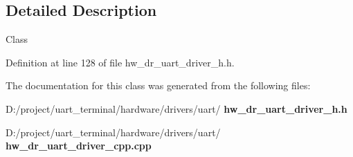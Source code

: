 \subsection{Detailed Description}
Class 

Definition at line 128 of file hw\+\_\+dr\+\_\+uart\+\_\+driver\+\_\+h.\+h.



The documentation for this class was generated from the following files\+:\begin{DoxyCompactItemize}
\item 
D\+:/project/uart\+\_\+terminal/hardware/drivers/uart/\textbf{ hw\+\_\+dr\+\_\+uart\+\_\+driver\+\_\+h.\+h}\item 
D\+:/project/uart\+\_\+terminal/hardware/drivers/uart/\textbf{ hw\+\_\+dr\+\_\+uart\+\_\+driver\+\_\+cpp.\+cpp}\end{DoxyCompactItemize}

